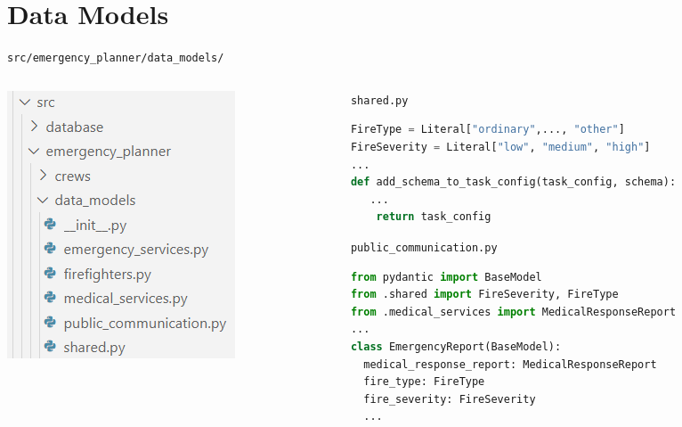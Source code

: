 \section*{Data Models}
\begin{frame}[fragile]{\texttt{src/emergency\_planner/data\_models/}}
  \begin{columns}[c]
    \begin{column}{0.3\textwidth}
        \includegraphics[width=\textwidth]{figures/data_models_folder.png}
    \end{column}
    \begin{column}{0.68\textwidth}
      \texttt{shared.py}
      \begin{lstlisting}[language=Python, breaklines=true]
FireType = Literal["ordinary",..., "other"]
FireSeverity = Literal["low", "medium", "high"]
... 
def add_schema_to_task_config(task_config, schema):
   ...
    return task_config
      \end{lstlisting}
      \texttt{public\_communication.py}
      \begin{lstlisting}[language=Python, breaklines=true]
from pydantic import BaseModel
from .shared import FireSeverity, FireType
from .medical_services import MedicalResponseReport
...
class EmergencyReport(BaseModel):
  medical_response_report: MedicalResponseReport
  fire_type: FireType
  fire_severity: FireSeverity
  ...
      \end{lstlisting}
    \end{column}
  \end{columns}
\end{frame}